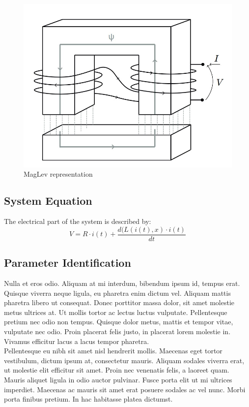 \documentclass[a4paper, 11pt] {article}
\begin{document}
\begin{figure}
\begin{center}
\includegraphics[scale=0.5]{Images/2_schema_elettrico}
\end{center}
\caption{MagLev representation}
\end{figure}


\subsection{System Equation}
The electrical part of the system is described by:
\begin{equation}
V = R \cdot i(t) + \frac{d(L(i(t),x) \cdot i(t)}{dt}
\end{equation}




\subsection{Parameter Identification}
 Nulla et eros odio. Aliquam at mi interdum, bibendum ipsum id, tempus erat. Quisque viverra neque ligula, eu pharetra enim dictum vel. Aliquam mattis pharetra libero ut consequat. Donec porttitor massa dolor, sit amet molestie metus ultrices at. Ut mollis tortor ac lectus luctus vulputate. Pellentesque pretium nec odio non tempus. Quisque dolor metus, mattis et tempor vitae, vulputate nec odio. Proin placerat felis justo, in placerat lorem molestie in. Vivamus efficitur lacus a lacus tempor pharetra.
\\
Pellentesque eu nibh sit amet nisl hendrerit mollis. Maecenas eget tortor vestibulum, dictum ipsum at, consectetur mauris. Aliquam sodales viverra erat, ut molestie elit efficitur sit amet. Proin nec venenatis felis, a laoreet quam. Mauris aliquet ligula in odio auctor pulvinar. Fusce porta elit ut mi ultrices imperdiet. Maecenas ac mauris sit amet erat posuere sodales ac vel nunc. Morbi porta finibus pretium. In hac habitasse platea dictumst. 
\end{document}

